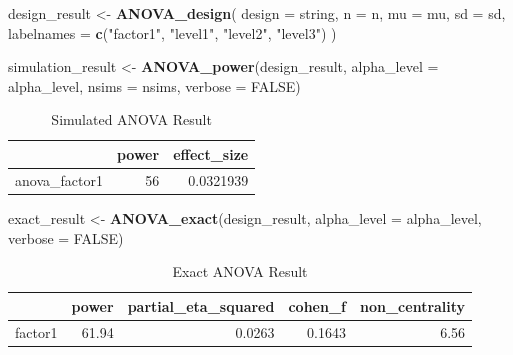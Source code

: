 \documentclass[]{book}
\newenvironment{Shaded}{\begin{snugshade}}{\end{snugshade}}
\newcommand{\DataTypeTok}[1]{\textcolor[rgb]{0.13,0.29,0.53}{#1}}
\newcommand{\KeywordTok}[1]{\textcolor[rgb]{0.13,0.29,0.53}{\textbf{#1}}}
\newcommand{\NormalTok}[1]{#1}
\newcommand{\OtherTok}[1]{\textcolor[rgb]{0.56,0.35,0.01}{#1}}
\newcommand{\StringTok}[1]{\textcolor[rgb]{0.31,0.60,0.02}{#1}}
\begin{document}
\begin{Shaded}
\begin{Highlighting}[]
\NormalTok{design_result <-}\StringTok{ }\KeywordTok{ANOVA_design}\NormalTok{(}
  \DataTypeTok{design =}\NormalTok{ string,}
  \DataTypeTok{n =}\NormalTok{ n,}
  \DataTypeTok{mu =}\NormalTok{ mu,}
  \DataTypeTok{sd =}\NormalTok{ sd,}
  \DataTypeTok{labelnames =} \KeywordTok{c}\NormalTok{(}\StringTok{"factor1"}\NormalTok{, }\StringTok{"level1"}\NormalTok{, }\StringTok{"level2"}\NormalTok{, }\StringTok{"level3"}\NormalTok{)}
\NormalTok{  )}

\NormalTok{simulation_result <-}\StringTok{ }\KeywordTok{ANOVA_power}\NormalTok{(design_result, }
                                 \DataTypeTok{alpha_level =}\NormalTok{ alpha_level, }
                                 \DataTypeTok{nsims =}\NormalTok{ nsims,}
                                 \DataTypeTok{verbose =} \OtherTok{FALSE}\NormalTok{)}
\end{Highlighting}
\end{Shaded}

\begin{table}[t]

\caption{\label{tab:unnamed-chunk-55}Simulated ANOVA Result}
\centering
\begin{tabular}{l|r|r}
\hline
  & power & effect\_size\\
\hline
anova\_factor1 & 56 & 0.0321939\\
\hline
\end{tabular}
\end{table}

\begin{Shaded}
\begin{Highlighting}[]
\NormalTok{exact_result <-}\StringTok{ }\KeywordTok{ANOVA_exact}\NormalTok{(design_result,}
                            \DataTypeTok{alpha_level =}\NormalTok{ alpha_level,}
                            \DataTypeTok{verbose =} \OtherTok{FALSE}\NormalTok{)}
\end{Highlighting}
\end{Shaded}

\begin{table}[t]

\caption{\label{tab:unnamed-chunk-57}Exact ANOVA Result}
\centering
\begin{tabular}{l|r|r|r|r}
\hline
  & power & partial\_eta\_squared & cohen\_f & non\_centrality\\
\hline
factor1 & 61.94 & 0.0263 & 0.1643 & 6.56\\
\hline
\end{tabular}
\end{table}
\end{document}
